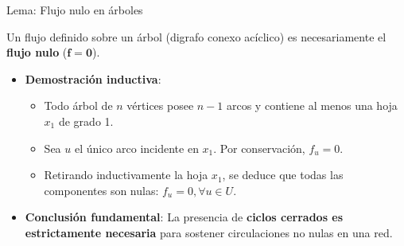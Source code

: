 \documentclass[
  ignorenonframetext,
]{beamer}
\providecommand{\tightlist}{%
  \setlength{\itemsep}{0pt}\setlength{\parskip}{0pt}}
\begin{document}
\begin{frame}{Lema: Flujo nulo en árboles}
\label{lema-flujo-nulo-en-uxe1rboles}
\begin{tcolorbox}[enhanced jigsaw, opacityback=0, breakable, title=\textcolor{quarto-callout-note-color}{\faInfo}\hspace{0.5em}{Flujo nulo en árboles}, colback=white, colbacktitle=quarto-callout-note-color!10!white, bottomrule=.15mm, opacitybacktitle=0.6, coltitle=black, bottomtitle=1mm, leftrule=.75mm, colframe=quarto-callout-note-color-frame, toptitle=1mm, titlerule=0mm, rightrule=.15mm, left=2mm, arc=.35mm, toprule=.15mm]

Un flujo definido sobre un árbol (digrafo conexo acíclico) es
necesariamente el \textbf{flujo nulo} (\(\mathbf{f} = \mathbf{0}\)).

\end{tcolorbox}

\begin{itemize}
\tightlist
\item
  \textbf{Demostración inductiva}:

  \begin{itemize}
  \tightlist
  \item
    Todo árbol de \(n\) vértices posee \(n - 1\) arcos y contiene al
    menos una hoja \(x_1\) de grado 1.
  \item
    Sea \(u\) el único arco incidente en \(x_1\). Por conservación,
    \(f_u = 0\).
  \item
    Retirando inductivamente la hoja \(x_1\), se deduce que todas las
    componentes son nulas: \(f_u = 0, \forall u \in U\).
  \end{itemize}
\item
  \textbf{Conclusión fundamental}: La presencia de \textbf{ciclos
  cerrados es estrictamente necesaria} para sostener circulaciones no
  nulas en una red.
\end{itemize}
\end{frame}
\end{document}
